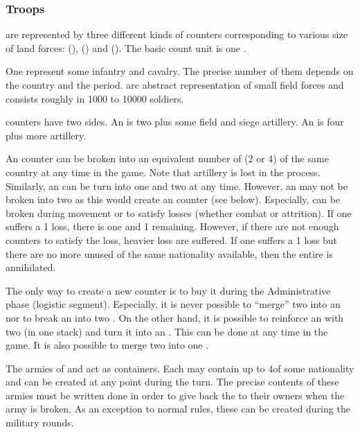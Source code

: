 \subsubsection{Troops}\label{chLogistic:Troops definition}
\aparag[Troops] are represented by three different kinds of counters
corresponding to various size of land forces:  (\ARMY),
 (\LD) and 
(\LDE).
\bparag The basic count unit is one \LD.

\aparag[Detachments.] One \LD represent some infantry and cavalry. The precise
number of them depends on the country and the period. \LD are abstract
representation of small field forces and consists roughly in 1000 to 10000
soldiers.

\aparag[Armies.] \ARMY counters have two sides. An \ARMY\facemoins is two \LD
plus some field and siege artillery. An \ARMY\faceplus is four \LD plus more
artillery.

 An \ARMY counter can be broken into an equivalent
number of \LD (2 or 4) of the same country at any time in the game. Note that
artillery is lost in the process.
\bparag Similarly, an \ARMY\faceplus can be turn into one \ARMY\facemoins and
two \LD at any time.
\bparag However, an \ARMY\faceplus may not be broken into two
\ARMY\facemoins as this would create an \ARMY counter (see below).
\bparag Especially, \ARMY can be broken during movement or to satisfy losses
(whether combat or attrition). If one \ARMY\faceplus suffers a 1 \LD loss,
there is one \ARMY\facemoins and 1 \LD remaining.
\bparag However, if there are not enough \LD counters to satisfy the loss,
heavier loss are suffered. If one \ARMY\facemoins suffers a 1 \LD loss but
there are no more unused \LD of the same nationality available, then the
entire \ARMY\facemoins is annihilated.

 The only way to create a new \ARMY
counter is to buy it during the Administrative phase (logistic segment).
\bparag Especially, it is never possible to ``merge'' two \LD into an
\ARMY\facemoins nor to break an \ARMY\faceplus into two \ARMY\facemoins.
\bparag On the other hand, it is possible to reinforce an \ARMY\facemoins with
two \LD (in one stack) and turn it into an \ARMY\faceplus. This can be done at
any time in the game.
\bparag It is also possible to merge two \ARMY\facemoins into one
\ARMY\faceplus.

 The armies of  and 
act as containers. Each may contain up to 4\LD of some nationality and can be
created at any point during the turn. The precise contents of these armies
must be written done in order to give back the \LD to their owners when the
army is broken.
\bparag As an exception to normal rules, these \ARMY can be created during the
military rounds.

